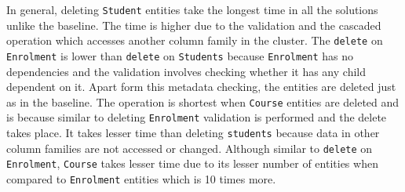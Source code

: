 In general, deleting \texttt{Student} entities take the longest time in all the
solutions unlike the baseline. The time is higher due to the validation and the
cascaded operation which accesses another column family in the cluster. The
\texttt{delete} on \texttt{Enrolment} is lower than \texttt{delete} on
\texttt{Students} because \texttt{Enrolment} has no dependencies and the
validation involves checking whether it has any child dependent on it. Apart
form this metadata checking, the entities are deleted just as in the baseline.
The operation is shortest when \texttt{Course} entities are deleted and is
because similar to deleting \texttt{Enrolment} validation is performed and the
delete takes place. It takes lesser time than deleting \texttt{students} because
data in other column families are not accessed or changed. Although similar to
\texttt{delete} on \texttt{Enrolment}, \texttt{Course} takes lesser time due to
its lesser number of entities when compared to \texttt{Enrolment} entities which
is 10 times more.



% 	

